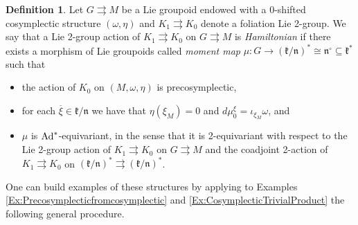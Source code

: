 \documentclass[
  a4paper, 
  reqno, 
  oneside, 
  12pt
]{amsart}
\theoremstyle{definition}
\newtheorem{definition}[theorem]{Definition}
\theoremstyle{remark}
\newcommand{\rr}{\rightrightarrows}
\begin{document}
\begin{definition}
Let $G\rr M$ be a Lie groupoid endowed with a 0-shifted cosymplectic structure $(\omega,\eta)$ and $K_1\rr K_0$ denote a foliation Lie 2-group. We say that a Lie 2-group action of $K_1\rr K_0$ on $G\rr M$ is \emph{Hamiltonian} if there exists a morphism of Lie groupoids called \emph{moment map} $\mu:G\to (\mathfrak{k}/\mathfrak{n})^\ast \cong \mathfrak{n}^\circ \subseteq \mathfrak{k}^\ast$ such that
\begin{itemize}
\item the action of $K_0$ on $(M,\omega,\eta)$ is precosymplectic,
\item for each $\overline{\xi}\in \mathfrak{k}/\mathfrak{n}$ we have that $\eta(\xi_M)=0$ and $d\mu^\xi_0=\iota_{\xi_M}\omega$, and
\item $\mu$ is $\textnormal{Ad}^\ast$-equivariant, in the sense that it is 2-equivariant with respect to the Lie 2-group action of $K_1\rr K_0$ on $G\rr M$ and the coadjoint 2-action of $K_1\rr K_0$ on $(\mathfrak{k}/\mathfrak{n})^\ast \rightrightarrows (\mathfrak{k}/\mathfrak{n})^\ast$.
\end{itemize}
\end{definition}

One can build examples of these structures by applying to Examples \ref{Ex:Precosymplecticfromcosymplectic} and \ref{Ex:CosymplecticTrivialProduct} the following general procedure.
\end{document}
